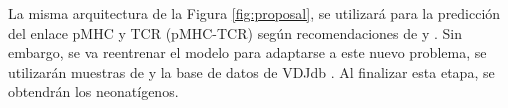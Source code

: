 \documentclass[a4paper,11pt]{article}
\begin{document}





La misma arquitectura de la Figura \ref{fig:proposal}, se utilizará para la predicción del enlace pMHC y TCR (pMHC-TCR) según recomendaciones de \cite{li2020progeo}  y \cite{myronov2023bertrand}. Sin embargo, se va reentrenar el modelo para adaptarse a este nuevo problema, se utilizarán muestras de \cite{li2020progeo} y la base de datos de VDJdb \citep{shugay2018vdjdb}. Al finalizar esta etapa, se obtendrán los neonatígenos.



















	
\end{document}
